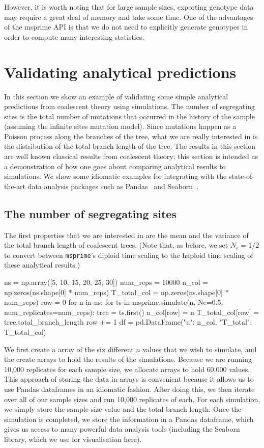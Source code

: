 \documentclass[graybox]{svmult}
\newcommand{\msprime}[0]{\texttt{msprime}}
\begin{document}
However, it is worth noting that for large sample sizes, exporting
genotype data may require a great deal of memory and take some time. One
of the advantages of the msprime API is that we do not need to
explicitly generate genotypes in order to compute many interesting
statistics.

\section{Validating analytical predictions}\label{validating-analytical-predictions}

In this section we show an example of validating some simple analytical
predictions from coalescent theory using simulations. The number of
segregating sites is the total number of mutations that occurred in the
history of the sample (assuming the infinite sites mutation model).
Since mutations happen as a Poisson process along the branches of the
tree, what we are really interested in is the distribution of the total
branch length of the tree. The results in this section are well known
classical results from coalescent theory; this section is intended as a
demonstration of how one goes about comparing analytical results to
simulations. We show some idiomatic examples for integrating with
the state-of-the-art data analysis packages such
as Pandas~\citep{mckinney2010data} and Seaborn~\citep{michael_waskom_2017_883859}.

\subsection{The number of segregating sites}
The first properties that we are interested in are the mean and the
variance of the total branch length of coalescent trees. (Note that, as
before, we set \(N_e=1/2\) to convert between \msprime's diploid time
scaling to the haploid time scaling of these analytical results.)

\begin{pythoncode}
ns = np.array([5, 10, 15, 20, 25, 30])
num_reps = 10000
n_col = np.zeros(ns.shape[0] * num_reps)
T_total_col = np.zeros(ns.shape[0] * num_reps)
row = 0
for n in ns:
    for ts in msprime.simulate(n, Ne=0.5, num_replicates=num_reps):
        tree = ts.first()
        n_col[row] = n
        T_total_col[row] = tree.total_branch_length
        row += 1
df = pd.DataFrame({"n": n_col, "T_total": T_total_col})
\end{pythoncode}

    We first create a array of the six different \(n\) values that we wish
to simulate, and the create arrays to hold the results of the
simulations. Because we are running 10,000 replicates for each sample
size, we allocate arrays to hold 60,000 values. This approach of storing
the data in arrays is convenient because it allows us to use Pandas
dataframes in an idiomatic fashion. After doing this, we then iterate
over all of our sample sizes and run 10,000 replicates of each. For each
simulation, we simply store the sample size value and the total branch
length. Once the simulation is completed, we store the information in a
Pandas dataframe, which gives us access to many powerful data analysis
tools (including the Seaborn library, which we use for visualisation
here).
\end{document}

